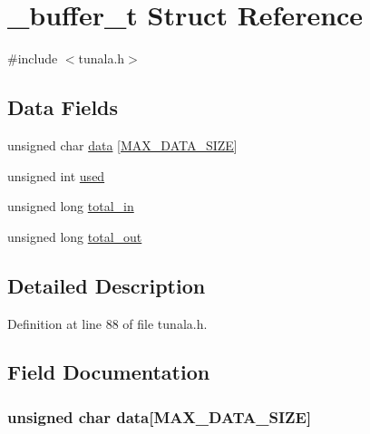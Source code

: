 \hypertarget{struct__buffer__t}{}\section{\+\_\+buffer\+\_\+t Struct Reference}
\label{struct__buffer__t}


{\ttfamily \#include $<$tunala.\+h$>$}

\subsection*{Data Fields}
\begin{DoxyCompactItemize}
\item 
unsigned char \hyperlink{struct__buffer__t_ac0a7e59a4c48626238b9c59a2df6a31c}{data} \mbox{[}\hyperlink{tunala_8h_a87f68e96fb938eddc39ad1f19d923a96}{M\+A\+X\+\_\+\+D\+A\+T\+A\+\_\+\+S\+I\+ZE}\mbox{]}
\item 
unsigned int \hyperlink{struct__buffer__t_a2590a5f33b83235fcf8740d3bb9b0e98}{used}
\item 
unsigned long \hyperlink{struct__buffer__t_ad4709f433ecfd17bc59938f62793bfc6}{total\+\_\+in}
\item 
unsigned long \hyperlink{struct__buffer__t_a36fccd25e68cfdb8a1e2745a47e03ce1}{total\+\_\+out}
\end{DoxyCompactItemize}


\subsection{Detailed Description}


Definition at line 88 of file tunala.\+h.



\subsection{Field Documentation}
\subsubsection[{\texorpdfstring{data}{data}}]{\setlength{\rightskip}{0pt plus 5cm}unsigned char data\mbox{[}{\bf M\+A\+X\+\_\+\+D\+A\+T\+A\+\_\+\+S\+I\+ZE}\mbox{]}}\hypertarget{struct__buffer__t_ac0a7e59a4c48626238b9c59a2df6a31c}{}\label{struct__buffer__t_ac0a7e59a4c48626238b9c59a2df6a31c}


